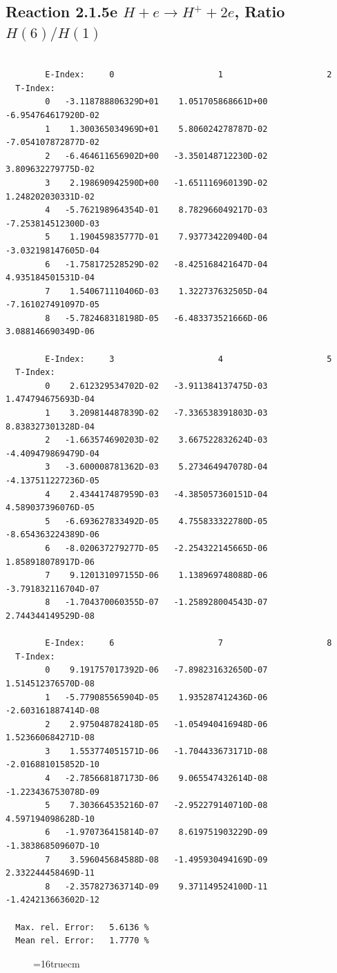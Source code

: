 \documentclass[12pt,dvips]{article}
\begin{document}
\newpage
\subsection{
Reaction 2.1.5e  $H + e \rightarrow H^+ + 2e$, Ratio $H(6)/H(1)$
}


\begin{small}\begin{verbatim}

        E-Index:     0                     1                     2
  T-Index:
        0   -3.118788806329D+01    1.051705868661D+00   -6.954764617920D-02
        1    1.300365034969D+01    5.806024278787D-02   -7.054107872877D-02
        2   -6.464611656902D+00   -3.350148712230D-02    3.809632279775D-02
        3    2.198690942590D+00   -1.651116960139D-02    1.248202030331D-02
        4   -5.762198964354D-01    8.782966049217D-03   -7.253814512300D-03
        5    1.190459835777D-01    7.937734220940D-04   -3.032198147605D-04
        6   -1.758172528529D-02   -8.425168421647D-04    4.935184501531D-04
        7    1.540671110406D-03    1.322737632505D-04   -7.161027491097D-05
        8   -5.782468318198D-05   -6.483373521666D-06    3.088146690349D-06

        E-Index:     3                     4                     5
  T-Index:
        0    2.612329534702D-02   -3.911384137475D-03    1.474794675693D-04
        1    3.209814487839D-02   -7.336538391803D-03    8.838327301328D-04
        2   -1.663574690203D-02    3.667522832624D-03   -4.409479869479D-04
        3   -3.600008781362D-03    5.273464947078D-04   -4.137511227236D-05
        4    2.434417487959D-03   -4.385057360151D-04    4.589037396076D-05
        5   -6.693627833492D-05    4.755833322780D-05   -8.654363224389D-06
        6   -8.020637279277D-05   -2.254322145665D-06    1.858918078917D-06
        7    9.120131097155D-06    1.138969748088D-06   -3.791832116704D-07
        8   -1.704370060355D-07   -1.258928004543D-07    2.744344149529D-08

        E-Index:     6                     7                     8
  T-Index:
        0    9.191757017392D-06   -7.898231632650D-07    1.514512376570D-08
        1   -5.779085565904D-05    1.935287412436D-06   -2.603161887414D-08
        2    2.975048782418D-05   -1.054940416948D-06    1.523660684271D-08
        3    1.553774051571D-06   -1.704433673171D-08   -2.016881015852D-10
        4   -2.785668187173D-06    9.065547432614D-08   -1.223436753078D-09
        5    7.303664535216D-07   -2.952279140710D-08    4.597194098628D-10
        6   -1.970736415814D-07    8.619751903229D-09   -1.383868509607D-10
        7    3.596045684588D-08   -1.495930494169D-09    2.332244458469D-11
        8   -2.357827363714D-09    9.371149524100D-11   -1.424213663602D-12

  Max. rel. Error:   5.6136 %
  Mean rel. Error:   1.7770 %

\end{verbatim}\end{small}
\begin{figure} \label{2.1.5e}
\epsfxsize=16truecm
\end{figure}
\end{document}
